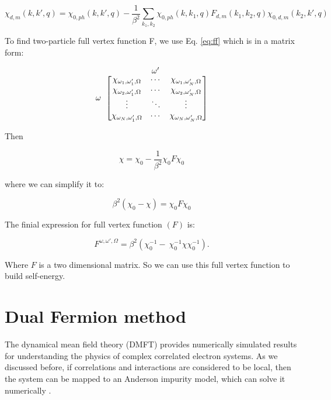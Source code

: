 \begin{equation}
    \chi_{d,m}(k,k',q)=\chi_{0,ph}(k,k',q)-\frac{1}{\beta^2}\sum_{k_1,k_2}\chi_{0,ph}(k,k_1,q)F_{d,m}(k_1,k_2,q)\chi_{0,d,m}(k_2,k',q)
    \label{eq:ff}
\end{equation}


To find two-particle full vertex  function F, we use Eq. \ref{eq:ff} which is in a matrix form:


\[
  \omega \textrm{ }
  \stackrel{\mbox{$\omega'$ }}{%
    \begin{bmatrix}
    \chi_{\omega_1,\omega'_1,\Omega}  & \cdots & \chi_{\omega_1,\omega'_N,\Omega} \\
    \chi_{\omega_2,\omega'_1,\Omega}  & \cdots & \chi_{\omega_2,\omega'_N,\Omega} \\
    \vdots & \ddots & \vdots \\
    \chi_{\omega_N,\omega'_1,\Omega}  & \cdots & \chi_{\omega_N,\omega'_N,\Omega}
    \end{bmatrix}%
  }
\]

\noindent Then

\begin{equation}
    \chi=\chi_0-\frac{1}{\beta^2} \chi_0 F \chi_0
\end{equation}

\noindent where we can simplify it to:

\begin{equation}
    \beta ^2(\chi_0-\chi) =\chi_0 F \chi_0
\end{equation}

\noindent The finial expression for full vertex function $(F)$ is:

\begin{equation}
    F^{\omega, \omega', \Omega}=\beta^2 (\chi _0^{-1}- \: \chi _0^{-1}\chi \chi _0^{-1}).
    \label{eq:full-ver}
\end{equation}

Where $F$ is a two dimensional matrix. So we can use this full vertex function to build self-energy. 

\section{Dual Fermion method}

The dynamical mean field theory (DMFT) provides numerically simulated results for understanding the physics of complex correlated electron systems. As we discussed before, if correlations and interactions are considered to be local, then the system can be mapped to an Anderson impurity model, which can solve it numerically \cite{Walter, Hartmann}.

